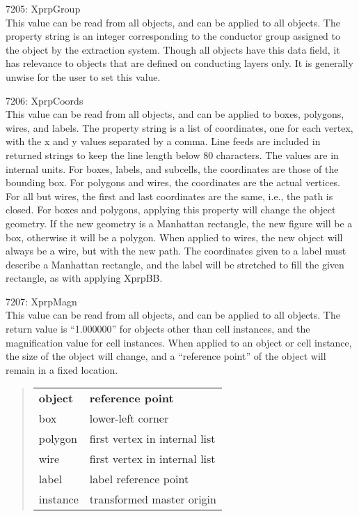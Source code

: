 \begin{description}
\item{7205: {\et XprpGroup}}\\
This value can be read from all objects, and can be applied to all
objects.  The property string is an integer corresponding to the
conductor group assigned to the object by the extraction system. 
Though all objects have this data field, it has relevance to objects
that are defined on conducting layers only.  It is generally unwise
for the user to set this value.

\item{7206: {\et XprpCoords}}\\
This value can be read from all objects, and can be applied to boxes,
polygons, wires, and labels.  The property string is a list of
coordinates, one for each vertex, with the {\et x} and {\et y} values
separated by a comma.  Line feeds are included in returned strings to
keep the line length below 80 characters.  The values are in internal
units.  For boxes, labels, and subcells, the coordinates are those of
the bounding box.  For polygons and wires, the coordinates are the
actual vertices.  For all but wires, the first and last coordinates
are the same, i.e., the path is closed.  For boxes and polygons,
applying this property will change the object geometry.  If the new
geometry is a Manhattan rectangle, the new figure will be a box,
otherwise it will be a polygon.  When applied to wires, the new object
will always be a wire, but with the new path.  The coordinates given
to a label must describe a Manhattan rectangle, and the label will be
stretched to fill the given rectangle, as with applying {\et XprpBB}.

\item{7207: {\et XprpMagn}}\\
This value can be read from all objects, and can be applied to all
objects.  The return value is ``1.000000'' for objects other than cell
instances, and the magnification value for cell instances.  When
applied to an object or cell instance, the size of the object will
change, and a ``reference point'' of the object will remain in a fixed
location.

\begin{quote}
\begin{tabular}{ll}\\
\bf object & \bf reference point\\
box & lower-left corner\\
polygon & first vertex in internal list\\
wire & first vertex in internal list\\
label & label reference point\\
instance & transformed master origin\\
\end{tabular}
\end{quote}


\end{description}
